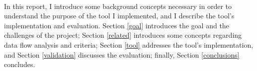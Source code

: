 \paragraph{}
In this report, I introduce some background concepts necessary in order to understand the purpose of the tool I implemented, and I describe the tool's implementation and evaluation. Section \ref{goal} introduces the goal and the challenges of the project; Section \ref{related} introduces some concepts regarding data flow analysis and criteria; Section \ref{tool} addresses the tool's implementation, and Section \ref{validation} discusses the evaluation; finally, Section  \ref{conclusions} concludes.



